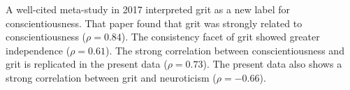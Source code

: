 \documentclass[review]{elsarticle}
\begin{document}
A well-cited meta-study in 2017 interpreted grit as a new label for conscientiousness\cite{schmidt2018same}.
That paper found that grit was strongly related to conscientiousness ($\rho = 0.84$).
The consistency facet of grit showed greater independence ($\rho = 0.61$).
The strong correlation between conscientiousness and grit is replicated in the present data ($\rho = 0.73$).
The present data also shows a strong correlation between grit and neuroticism ($\rho = -0.66$).




\end{document}
